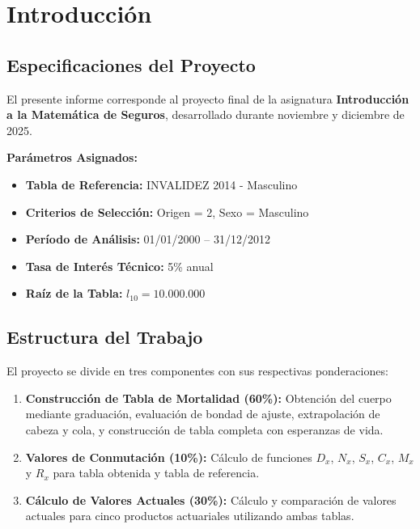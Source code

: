 
\section{Introducción}

\subsection{Especificaciones del Proyecto}

El presente informe corresponde al proyecto final de la asignatura \textbf{Introducción a la Matemática de Seguros}, desarrollado durante noviembre y diciembre de 2025.

\begin{hallazgobox}
\textbf{Parámetros Asignados:}
\begin{itemize}
    \item \textbf{Tabla de Referencia:} INVALIDEZ 2014 - Masculino
    \item \textbf{Criterios de Selección:} Origen = 2, Sexo = Masculino
    \item \textbf{Período de Análisis:} 01/01/2000 -- 31/12/2012
    \item \textbf{Tasa de Interés Técnico:} 5\% anual
    \item \textbf{Raíz de la Tabla:} $l_{10} = 10.000.000$
\end{itemize}
\end{hallazgobox}

\subsection{Estructura del Trabajo}

El proyecto se divide en tres componentes con sus respectivas ponderaciones:

\begin{enumerate}
    \item \textbf{Construcción de Tabla de Mortalidad (60\%):} Obtención del cuerpo mediante graduación, evaluación de bondad de ajuste, extrapolación de cabeza y cola, y construcción de tabla completa con esperanzas de vida.
    
    \item \textbf{Valores de Conmutación (10\%):} Cálculo de funciones $D_x$, $N_x$, $S_x$, $C_x$, $M_x$ y $R_x$ para tabla obtenida y tabla de referencia.
    
    \item \textbf{Cálculo de Valores Actuales (30\%):} Cálculo y comparación de valores actuales para cinco productos actuariales utilizando ambas tablas.
\end{enumerate}

